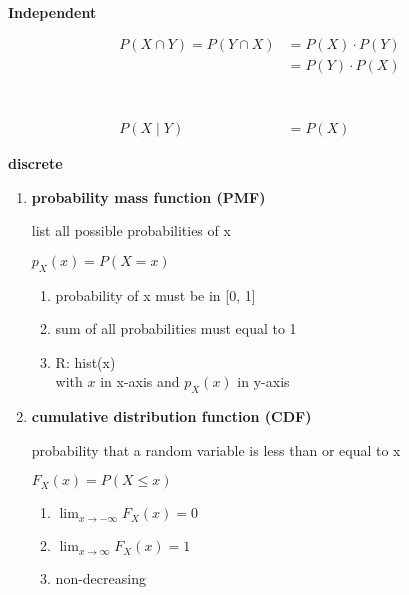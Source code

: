 \documentclass{article}
\begin{document}
\begin{small}
\begin{multicols}{2}
\columnbreak
\textbf{Independent}
\begin{align*}
\\\\
P(X \cap Y) = P(Y \cap X) & = P(X) \cdot P(Y) \\
            & = P(Y) \cdot P(X) \\\\
\\\\\\\\\\\\
P(X \mid Y) & = P(X) 
\end{align*}
\end{multicols}
\begin{multicols}{2}
\textbf{discrete}
\begin{enumerate}
\item\textbf{probability mass function (PMF)}

list all possible probabilities of x

$p_X(x) = P(X = x)$

  \begin{enumerate}
  \item probability of x must be in [0, 1]
  \item sum of all probabilities must equal to 1
  \item R: hist(x) \\ with $x$ in x-axis and $p_X(x)$ in y-axis
  \end{enumerate}

\item\textbf{cumulative distribution function (CDF)}

probability that a random variable is less than or equal to x

$F_X(x) = P(X \leq x)$

  \begin{enumerate}
  \item $\lim_{x\to-\infty} F_X(x) = 0$
  \item $\lim_{x\to\infty} F_X(x) = 1$
  \item non-decreasing
  \end{enumerate}


\end{enumerate}
\end{multicols}
\end{small}
\end{document}
